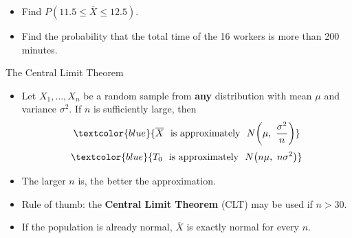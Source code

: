 \documentclass[12pt]{beamer}
\newcommand{\keyterm}[1]{\textcolor{examplegreen}{\textbf{#1}}}
\newcommand{\fitO}{}
\newcommand{\exlists}{\setlength{\itemsep}{0pt}}
\newcommand{\Xbar}{\overline{X}}
\begin{document}
\begin{frame}[t]{}\fitO\exlists
\begin{itemize}
\item[b)] Find $P(11.5\le \Xbar\le 12.5)$.\\[3.4cm]
\item[c)] Find the probability that the total time of the 16 workers is more than 200 minutes.\\[0.2cm]
\end{itemize}
\end{frame}

\begin{frame}[t]{The Central Limit Theorem}
\begin{itemize}
\item Let $X_1,\dots,X_n$ be a random sample from \textbf{any} distribution with
  mean $\mu$ and variance $\sigma^2$. If $n$ is sufficiently large, then
\[
\textcolor{blue}{\Xbar\ \text{ is approximately }\ N\!\left(\mu,\ \frac{\sigma^2}{n}\right)}
\]
\[
\textcolor{blue}{T_0\ \text{ is approximately }\ N\!\left(n\mu,\ n\sigma^2\right)}
\]
\item The larger $n$ is, the better the approximation.
\item Rule of thumb: the \keyterm{Central Limit Theorem} (CLT) may be used if $n>30$.
\item If the population is already normal, $\Xbar$ is exactly normal for every $n$.
\end{itemize}
\end{frame}
\end{document}
